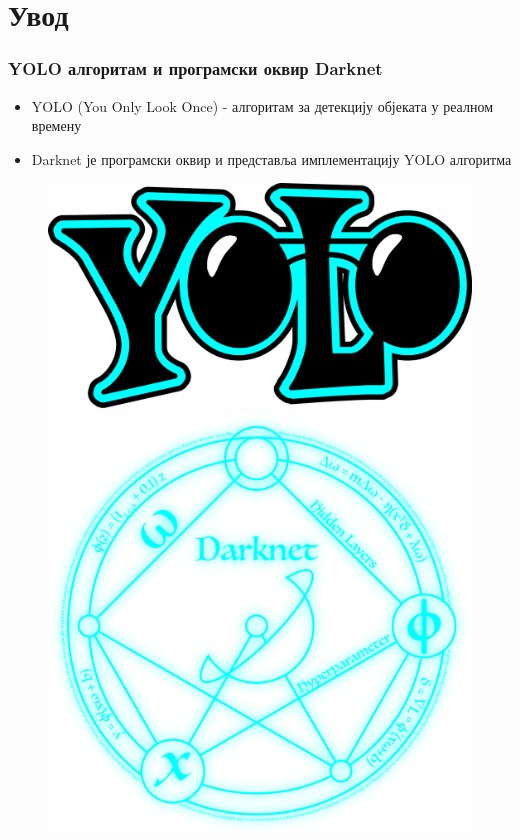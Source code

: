\maketitle

\section{Увод}

\begin{frame}
\frametitle{YOLO алгоритам и програмски оквир Darknet}

\begin{itemize}
 \item YOLO (You Only Look Once) - алгоритам за детекцију објеката у реалном времену
 \item Darknet је програмски оквир и представља имплементацију YOLO алгоритма
\end{itemize}

\begin{figure}[H]
  \centering
      \includegraphics[scale=0.2]{slike/yologo.png} \\
      \includegraphics[scale=0.15]{slike/darknet.png}
\end{figure}

\end{frame}

